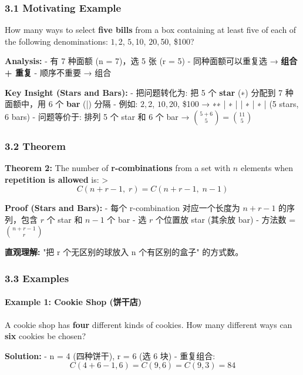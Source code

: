 \documentclass[10pt,a4paper,openany]{ctexbook}
\theoremstyle{definition}
\theoremstyle{remark}
\renewenvironment{quote}
  {\list{}{\leftmargin=1em\rightmargin=0pt\topsep=0.5pt\partopsep=0pt}\item[]}
  {\endlist}
\begin{document}
\subsubsection{3.1 Motivating Example}

\begin{quote}
How many ways to select \textbf{five bills} from a box containing at least five of each of the following denominations: $1, $2, $5, $10, $20, $50, \$100?

\textbf{Analysis:}
- 有 7 种面额 (n = 7)，选 5 张 (r = 5)
- 同种面额可以重复选 → \textbf{组合 + 重复}
- 顺序不重要 → 组合

\textbf{Key Insight (Stars and Bars):}
- 把问题转化为: 把 5 个 \textbf{star} (∗) 分配到 7 种面额中，用 6 个 \textbf{bar} (|) 分隔
- 例如: $2, $2, $10, $20, \$100 → ∗∗ | ∗ | | ∗ | ∗ | (5 stars, 6 bars)
- 问题等价于: 排列 5 个 star 和 6 个 bar → $\binom{5+6}{5} = \binom{11}{5}$

\end{quote}

\subsubsection{3.2 Theorem}

\begin{quote}
\textbf{Theorem 2:} The number of \textbf{r-combinations} from a set with $n$ elements when \textbf{repetition is allowed} is:
>
\[
C(n + r - 1, \; r) = C(n + r - 1, \; n - 1)
\]


\textbf{Proof (Stars and Bars):}
- 每个 r-combination 对应一个长度为 $n + r - 1$ 的序列，包含 $r$ 个 star 和 $n-1$ 个 bar
- 选 $r$ 个位置放 star (其余放 bar)
- 方法数 = $\binom{n+r-1}{r}$

\textbf{直观理解:} "把 r 个无区别的球放入 n 个有区别的盒子" 的方式数。

\end{quote}

\subsubsection{3.3 Examples}

\paragraph{Example 1: Cookie Shop (饼干店)}

\begin{quote}
A cookie shop has \textbf{four} different kinds of cookies. How many different ways can \textbf{six} cookies be chosen?

\textbf{Solution:}
- n = 4 (四种饼干), r = 6 (选 6 块)
- 重复组合:
\[
C(4 + 6 - 1, 6) = C(9, 6) = C(9, 3) = 84
\]


\end{quote}
\end{document}
